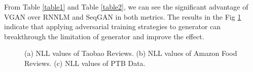 \documentclass{llncs}
\begin{document}
From Table \ref{table1} and Table \ref{table2}, we can see the significant advantage of VGAN over RNNLM and SeqGAN in both metrics. The results in the Fig \ref{fig:fig 4} indicate that applying adversarial training strategies to generator can breakthrough the limitation of generator and improve the effect.
\begin{figure}
\centering
{}
\caption{(a) NLL values of Taobao Reviews. (b) NLL values of Amazon Food Reviews. (c) NLL values of PTB Data.}
\label{fig:fig 4}
\end{figure}
\end{document}
